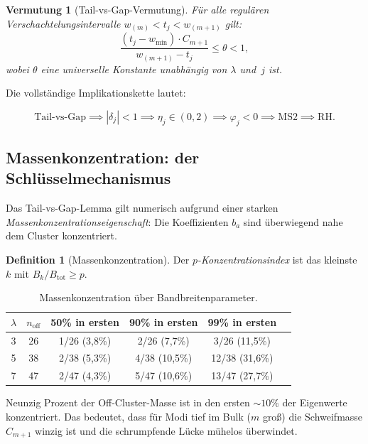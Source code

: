 \documentclass[12pt,a4paper]{article}
\newtheorem{conjecture}[theorem]{Vermutung}
\theoremstyle{definition}
\newtheorem{definition}[theorem]{Definition}
\theoremstyle{remark}
\newcommand{\off}{\mathrm{off}}
\newcommand{\wmin}{w_{\min}}
\begin{document}
\begin{conjecture}[Tail-vs-Gap-Vermutung]
\label{conj:tvg}
Für alle regulären Verschachtelungsintervalle $w_{(m)} < t_j < w_{(m+1)}$ gilt:
\begin{equation}
\label{eq:tvg}
\frac{(t_j - \wmin) \cdot C_{m+1}}{w_{(m+1)} - t_j} \leq \theta < 1,
\end{equation}
wobei $\theta$ eine universelle Konstante unabhängig von $\lambda$ und~$j$ ist.
\end{conjecture}

Die vollständige Implikationskette lautet:

\begin{equation}
\label{eq:chain}
\boxed{
\text{Tail-vs-Gap}
\!\implies\! |\delta_j| < 1
\!\implies\! \eta_j \in (0,2)
\!\implies\! \varphi_j < 0
\!\implies\! \text{MS2}
\!\implies\! \text{RH}.
}
\end{equation}

\subsection{Massenkonzentration: der Schlüsselmechanismus}

Das Tail-vs-Gap-Lemma gilt numerisch aufgrund einer starken
\emph{Massenkonzentrationseigenschaft}: Die Koeffizienten $b_a$ sind
überwiegend nahe dem Cluster konzentriert.

\begin{definition}[Massenkonzentration]
Der \emph{$p$-Konzentrationsindex} ist das kleinste $k$ mit
$B_k / B_{\mathrm{tot}} \geq p$.
\end{definition}

\begin{table}[h]
\centering
\caption{Massenkonzentration über Bandbreitenparameter.}
\label{tab:mass}
\begin{tabular}{cccccc}
\toprule
$\lambda$ & $n_{\off}$ & 50\% in ersten & 90\% in ersten & 99\% in ersten \\
\midrule
3 & 26 & 1/26 (3,8\%) & 2/26 (7,7\%) & 3/26 (11,5\%) \\
5 & 38 & 2/38 (5,3\%) & 4/38 (10,5\%) & 12/38 (31,6\%) \\
7 & 47 & 2/47 (4,3\%) & 5/47 (10,6\%) & 13/47 (27,7\%) \\
\bottomrule
\end{tabular}
\end{table}

Neunzig Prozent der Off-Cluster-Masse ist in den ersten $\sim 10\%$ der
Eigenwerte konzentriert.
Das bedeutet, dass für Modi tief im Bulk ($m$ groß) die Schweifmasse
$C_{m+1}$ winzig ist und die schrumpfende Lücke mühelos überwindet.
\end{document}
